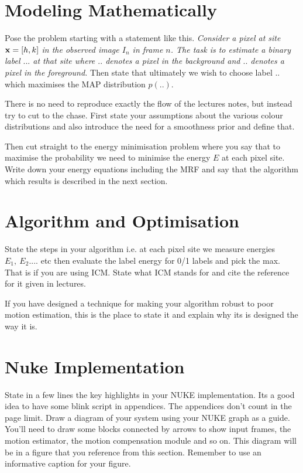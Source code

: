 \documentclass[conference]{IEEEtran}
\begin{document}
\section{Modeling Mathematically}
Pose the problem starting with a statement like this. {\em Consider a pixel at site ${\bf x}=[h,k]$ in the observed image $I_n$ in frame $n$. The task is to estimate a binary label $...$ at that site where $..$ denotes a pixel in the background and $..$ denotes a pixel in the foreground.} Then state that ultimately we wish to choose label $..$ which maximises the MAP distribution $p(..)$. 

There is no need to reproduce exactly the flow of the lectures notes, but instead try to cut to the chase. First state your assumptions about the various colour distributions and also introduce the need for a smoothness prior and define that.

Then cut straight to the energy minimisation problem where you say that to maximise the probability we need to minimise the energy $E$ at each pixel site. Write down your energy equations including the MRF and say that the algorithm which results is described in the next section.

\section{Algorithm and Optimisation}
State the steps in your algorithm i.e. at each pixel site we measure energies $E_1,~E_2....$ etc then evaluate the label energy for 0/1 labels and pick the max. That is if you are using ICM. State what ICM stands for and cite the reference for it given in lectures.

If you have designed a technique for making your algorithm robust to poor motion estimation, this is the place to state it and explain why its is designed the way it is.

\section{Nuke Implementation}
State in a few lines the key highlights in your NUKE implementation. Its a good idea to have some blink script in appendices. The appendices don't count in the page limit.
Draw a diagram of your system using your NUKE graph as a guide. You'll need to draw some blocks
connected by arrows to show input frames, the motion estimator, the motion compensation module and so on. This diagram will be in a figure that you reference from this section. Remember to use an informative caption for your figure.
\end{document}

